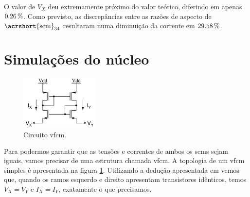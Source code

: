\documentclass[10pt,a4paper]{extreport}
\newcommand{\?}{\stackrel{?}{=}}
\newcommand{\sis}[2]{\complexnum{#1}\,\si[per-mode=symbol]{#2}}
\begin{document}
O valor de $V_X$ deu extremamente próximo do valor teórico, diferindo em apenas $\sis{0.26}{\percent}$. Como previsto, as discrepâncias entre as razões de aspecto de $\text{\acrshort{scm}}_{34}$ resultaram numa diminuição da corrente em $\sis{29.58}{\percent}$.

\pagebreak

\section{Simulações do núcleo}

\begin{figure}
    \centering
    \vspace{-0.5cm}
    \includegraphics[width=0.35\textwidth]{Imagens/vfcm_simple_circuit.jpg}
    \caption{Circuito \acrshort{vfcm}.}
    \label{fig:vfcm_simple_circuit}
\end{figure}

Para podermos garantir que as tensões e correntes de ambos os \acrshort{scm}s sejam iguais, vamos precisar de uma estrutura chamada \acrfull{vfcm}. A topologia de um \acrshort{vfcm} simples é apresentada na figura \ref{fig:vfcm_simple_circuit}. Utilizando a dedução apresentada em \cite{sbcs} vemos que, quando os ramos esquerdo e direito apresentam transistores idênticos, temos $V_X=V_Y$ e $I_X=I_Y$, exatamente o que precisamos.
\end{document}
